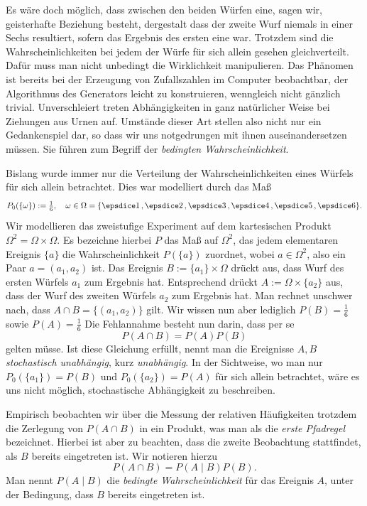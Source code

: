 Es wäre doch möglich, dass zwischen den beiden Würfen eine,
sagen wir, geisterhafte Beziehung besteht, dergestalt dass
der zweite Wurf niemals in einer Sechs resultiert, sofern das
Ergebnis des ersten eine war. Trotzdem sind die Wahrscheinlichkeiten bei
jedem der Würfe für sich allein gesehen gleichverteilt. Dafür muss man
nicht unbedingt die Wirklichkeit manipulieren. Das Phänomen ist bereits
bei der Erzeugung von Zufallszahlen im Computer beobachtbar, der Algorithmus
des Generators leicht zu konstruieren, wenngleich nicht gänzlich
trivial. Unverschleiert treten Abhängigkeiten in ganz natürlicher Weise
bei Ziehungen aus Urnen auf. Umstände dieser Art stellen also
nicht nur ein Gedankenspiel dar, so dass wir uns notgedrungen mit ihnen
auseinandersetzen müssen. Sie führen zum Begriff der
\emph{bedingten Wahrscheinlichkeit}.

Bislang wurde immer nur die Verteilung der Wahrscheinlichkeiten eines
Würfels für sich allein betrachtet. Dies war modelliert durch das Maß
\[P_0(\{\omega\}):=\tfrac{1}{6},\quad
\omega\in\Omega=\{\dicesp{1},\dicesp{2},\dicesp{3},\dicesp{4},\dicesp{5},\dice{6}\}.\]
Wir modellieren das zweistufige Experiment auf dem kartesischen
Produkt $\Omega^2 = \Omega\times\Omega$. Es bezeichne hierbei $P$ das
Maß auf $\Omega^2$, das jedem elementaren Ereignis $\{a\}$ die
Wahrscheinlichkeit $P(\{a\})$ zuordnet, wobei $a\in\Omega^2$,
also ein Paar $a = (a_1,a_2)$ ist. Das Ereignis $B:=\{a_1\}\times\Omega$
drückt aus, dass Wurf des ersten Würfels $a_1$ zum Ergebnis hat.
Entsprechend drückt $A:=\Omega\times\{a_2\}$ aus, dass der Wurf des
zweiten Würfels $a_2$ zum Ergebnis hat. Man rechnet unschwer nach, dass
$A\cap B=\{(a_1,a_2)\}$ gilt. Wir wissen nun aber lediglich
$P(B) = \tfrac{1}{6}$ sowie $P(A) = \tfrac{1}{6}$
Die Fehlannahme besteht nun darin, dass per se
\[P(A\cap B) = P(A)P(B)\]
gelten müsse. Ist diese Gleichung erfüllt, nennt man die Ereignisse
$A,B$ \emph{stochastisch unabhängig}, kurz \emph{unabhängig}. In der
Sichtweise, wo man nur $P_0(\{a_1\})=P(B)$ und $P_0(\{a_2\})=P(A)$
für sich allein betrachtet, wäre es uns nicht möglich, stochastische
Abhängigkeit zu beschreiben.

Empirisch beobachten wir über die Messung der relativen Häufigkeiten
trotzdem die Zerlegung von $P(A\cap B)$ in ein Produkt, was man als die
\emph{erste Pfadregel} bezeichnet. Hierbei ist aber zu beachten, dass die
zweite Beobachtung stattfindet, als $B$ bereits eingetreten ist. Wir
notieren hierzu
\[P(A\cap B) = P(A\mid B)P(B).\]
Man nennt $P(A\mid B)$ die \emph{bedingte Wahrscheinlichkeit} für das
Ereignis $A$, unter der Bedingung, dass $B$ bereits eingetreten ist.

